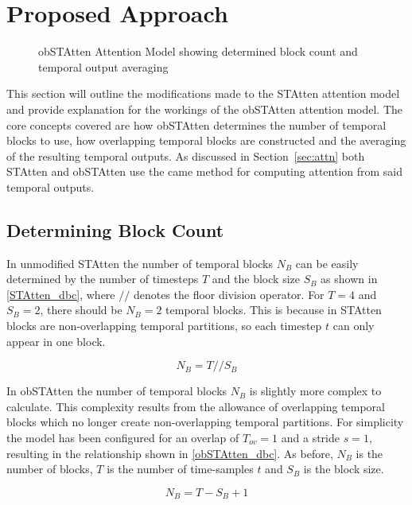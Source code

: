 \documentclass[../main.tex]{subfiles}
\begin{document}
\section{Proposed Approach}
\label{sec:prop}

\begin{figure}[t]
  \centering
  
  \caption{obSTAtten Attention Model showing determined block count and temporal output averaging}
  \label{fig:ob_fig}
\end{figure}

This section will outline the modifications made to the STAtten attention model\cite{STAtten} and provide explanation for the workings of the obSTAtten attention model. The core concepts covered are how obSTAtten determines the number of temporal blocks to use, how overlapping temporal blocks are constructed and the averaging of the resulting temporal outputs. As discussed in Section~\ref{sec:attn} both STAtten and obSTAtten use the came method for computing attention from said temporal outputs.

\subsection{Determining Block Count}
In unmodified STAtten the number of temporal blocks $N_B$ can be easily determined by the number of timesteps $T$ and the block size $S_B$ as shown in \eqref{STAtten_dbc}, where $//$ denotes the floor division operator. For $T=4$ and $S_B=2$, there should be $N_B=2$ temporal blocks. This is because in STAtten blocks are non-overlapping temporal partitions, so each timestep $t$ can only appear in one block.

\begin{equation}\label{STAtten_dbc}
N_B=T//S_B
\end{equation}

\par In obSTAtten the number of temporal blocks $N_B$ is slightly more complex to calculate. This complexity results from the allowance of overlapping temporal blocks which no longer create non-overlapping temporal partitions. For simplicity the model has been configured for an overlap of $T_{ov}=1$ and a stride $s=1$, resulting in the relationship shown in \eqref{obSTAtten_dbc}. As before, $N_B$ is the number of blocks, $T$ is the number of time-samples $t$ and $S_B$ is the block size.

\begin{equation}\label{obSTAtten_dbc}
N_B=T-S_B+1
\end{equation}
\end{document}
